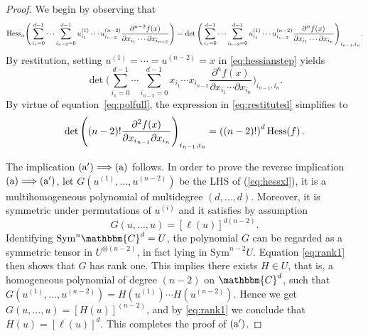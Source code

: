 \documentclass[aps,floatfix,groupedaddress,superscriptaddress,longbibliography,footinbib,notitlepage,showpacs]{revtex4-1}
\def\Hess{{\rm Hess}}
\begin{document}
\begin{proof}
We begin by observing that
\begin{equation}\label{eq:hessianstep}
\Hess_x\Bigg(\sum_{i_1=0}^{d-1}\cdots\sum_{i_{n-2}=0}^{d-1} u^{(1)}_{i_1}\cdots u^{(n-2)}_{i_{n-2}}
\frac{\partial^{n-2}f(x)}{\partial x_{i_1}\cdots\partial {x_{i_{n-2}}}}\Bigg)=
\det\Bigg(\sum_{i_1=0}^{d-1}\cdots\sum_{i_{n-2}=0}^{d-1} u^{(1)}_{i_1}\cdots u^{(n-2)}_{i_{n-2}}
\frac{\partial^{n}f(x)}{\partial x_{i_1}\cdots\partial {x_{i_{n}}}}\Bigg)_{i_{n-1},i_n}.
\end{equation}
By restitution, setting $u^{(1)}=\cdots=u^{(n-2)}=x$ in \eqref{eq:hessianstep} yields
\begin{equation}\label{eq:restituted}
\det\Bigg(\sum_{i_1=0}^{d-1}\cdots\sum_{i_{n-2}=0}^{d-1} x_{i_1}\cdots x_{i_{n-2}}
\frac{\partial^{n}f(x)}{\partial x_{i_1}\cdots\partial {x_{i_{n}}}}\Bigg)_{i_{n-1},i_n}.
\end{equation}
By virtue of equation~\eqref{eq:polfull}, the expression in \eqref{eq:restituted} simplifies to
\begin{equation}
\det\Bigg((n-2)!
\frac{\partial^{2}f(x)}{\partial x_{i_{n-1}}\partial {x_{i_{n}}}}\Bigg)_{i_{n-1},i_n}=\left((n-2)!\right)^d\Hess(f)\,.
\end{equation}

The implication $(\textnormal{a}^{\prime}) \Longrightarrow (\textnormal{a})$ follows. In order to prove the reverse implication $(\textnormal{a}) \Longrightarrow (\textnormal{a}^{\prime})$, let $G(u^{(1)},\ldots, u^{(n-2)})$ be the LHS of (\ref{eq:hessxl}), it is a multihomogeneous polynomial of multidegree $(d,\ldots, d)$. Moreover, it is symmetric under permutations of $u^{(i)}$ and it satisfies by assumption
\begin{equation}\label{eq:rank1}
G(u,\ldots, u)=\left[\ell(u)\right]^{d(n-2)}.
\end{equation}
Identifying $\mathrm{Sym}^n \mathbbm{C}^d = U$, the polynomial $G$ can be regarded as a symmetric tensor in $U^{\otimes(n-2)}$, in fact lying in $\mathrm{Sym}^{n-2} U$. Equation \eqref{eq:rank1} then shows that $G$ has rank one. This implies there exists $H \in U$, that is, a homogeneous polynomial of degree $(n-2)$ on $\mathbbm{C}^d$, such that $G(u^{(1)},\ldots, u^{(n-2)})=H(u^{(1)})\cdots H(u^{(n-2)})$. Hence we get $G(u,\ldots,u)=[H(u)]^{(n-2)}$, and by \eqref{eq:rank1} we conclude that $H(u) = [\ell(u)]^d$. This completes the proof of $(\textnormal{a}^{\prime})$.
\end{proof}
\end{document}
